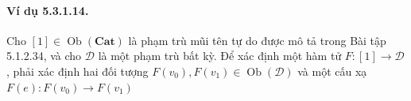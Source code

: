 \paragraph{Ví dụ 5.3.1.14.} Cho $[1]\in\operatorname{Ob}(\mathbf{Cat})$ là phạm trù mũi tên tự do được mô tả trong Bài tập 5.1.2.34, và cho $\mathcal D$ là một phạm trù bất kỳ. Để xác định một hàm tử $F:[1]\to\mathcal D$, phải xác định hai đối tượng $F(v_0),F(v_1)\in\operatorname{Ob}(\mathcal D)$ và một cấu xạ $F(e):F(v_0)\to F(v_1)$

